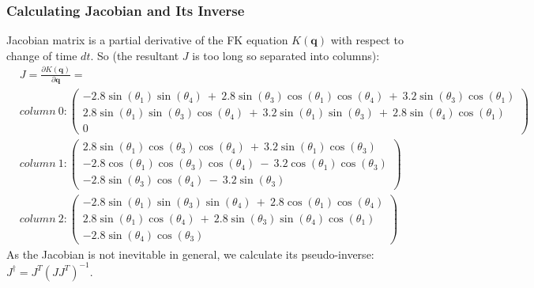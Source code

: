 \documentclass[11pt]{article}
\begin{document}
\subsubsection{Calculating Jacobian and Its Inverse}

Jacobian matrix is a partial derivative of the FK equation $K(\mathbf{q})$ with respect to change of time $dt$. So (the resultant $J$ is too long so separated into columns):
\begin{equation}
\begin{split}
& J=\frac{\partial K(\mathbf{q})}{\partial \mathbf{q}} = \\
& column \: 0: \begin{pmatrix}-2.8\sin\left(\theta_{1}\right)\sin\left(\theta_{4}\right)\:+\:2.8\sin\left(\theta_{3}\right)\cos\left(\theta_{1}\right)\cos\left(\theta_{4}\right)\:+\:3.2\sin\left(\theta_{3}\right)\cos\left(\theta_{1}\right)\\ 2.8\sin\left(\theta_{1}\right)\sin\left(\theta_{3}\right)\cos\left(\theta_{4}\right)\:+\:3.2\sin\left(\theta_{1}\right)\sin\left(\theta_{3}\right)\:+\:2.8\sin\left(\theta_{4}\right)\cos\left(\theta_{1}\right)\\ 0\end{pmatrix} \\
& column \: 1: \begin{pmatrix}2.8\sin\left(\theta_{1}\right)\cos\left(\theta_{3}\right)\cos\left(\theta_{4}\right)\:+\:3.2\sin\left(\theta_{1}\right)\cos\left(\theta_{3}\right)\\ -2.8\cos\left(\theta_{1}\right)\cos\left(\theta_{3}\right)\cos\left(\theta_{4}\right)\:-\:3.2\cos\left(\theta_{1}\right)\cos\left(\theta_{3}\right)\\ -2.8\sin\left(\theta_{3}\right)\cos\left(\theta_{4}\right)\:-\:3.2\sin\left(\theta_{3}\right)\end{pmatrix} \\
& column \: 2: \begin{pmatrix}-2.8\sin\left(\theta_{1}\right)\sin\left(\theta_{3}\right)\sin\left(\theta_{4}\right)\:+\:2.8\cos\left(\theta_{1}\right)\cos\left(\theta_{4}\right)\\ 2.8\sin\left(\theta_{1}\right)\cos\left(\theta_{4}\right)\:+\:2.8\sin\left(\theta_{3}\right)\sin\left(\theta_{4}\right)\cos\left(\theta_{1}\right)\\ -2.8\sin\left(\theta_{4}\right) \cos\left(\theta_{3}\right)\end{pmatrix} 
\end{split}
\end{equation}
As the Jacobian is not inevitable in general, we calculate its pseudo-inverse: $J^{\dagger}=J^{T}(JJ^{T})^{-1}$.
\end{document}
